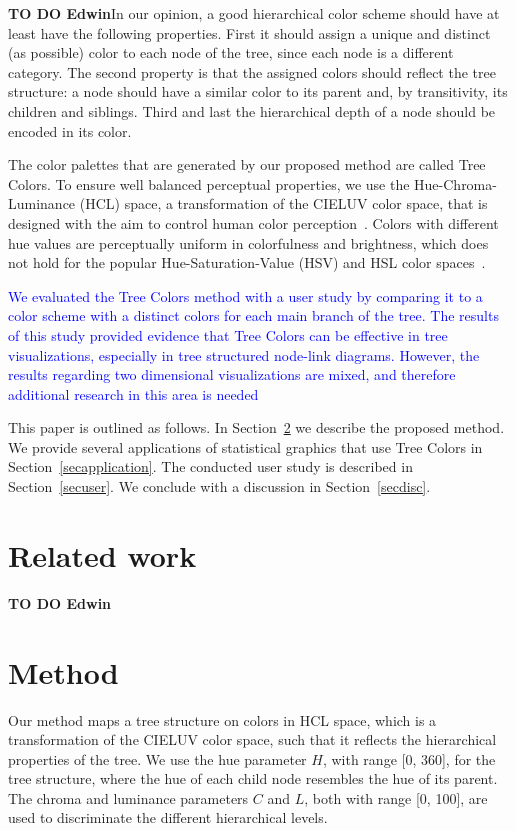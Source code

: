 \documentclass[review,journal]{vgtc}         %
\newcommand{\E}{\textcolor{cornellred}{\textbf{TO DO Edwin}}}
\newcommand{\changedM}[1]{\textcolor{blue}{#1}}
\begin{document}
\E In our opinion, a good hierarchical color scheme should have at least have the following properties. First it should assign a unique and distinct (as possible) color to each node of the tree, since each node is a different category. The second property is that the assigned colors should reflect the tree structure: a node should have a similar color to its parent and, by transitivity, its children and siblings.
Third and last the hierarchical depth of a node should be encoded in its color. 

The color palettes that are generated by our proposed method are called Tree Colors. To ensure well
balanced perceptual properties, we use the Hue-Chroma-Luminance (HCL) space, a transformation of the CIELUV color space, that is designed with the aim to control human color perception~\cite{ihaka2003}. Colors with different hue values are perceptually uniform in colorfulness and brightness, which does not hold for the popular Hue-Saturation-Value (HSV) and HSL color spaces~\cite{zeileis2009}.

\changedM{We evaluated the Tree Colors method with a user study by comparing it to a color scheme with a distinct colors for each main branch of the tree. The results of this study provided evidence that Tree Colors can be effective in tree visualizations, especially in tree structured node-link diagrams. However, the results regarding two dimensional visualizations are mixed, and therefore additional research in this area is needed}

This paper is outlined as follows. In Section~\ref{secmethod} we describe the proposed method. We provide several applications of statistical graphics that use Tree Colors in Section~\ref{secapplication}. The conducted user study is described in Section~\ref{secuser}. We conclude with a discussion in Section~\ref{secdisc}.

\section{Related work}
\E %

\section{Method}\label{secmethod}
Our method maps a tree structure on colors in HCL space, which is a transformation of the CIELUV color space, such that it reflects the hierarchical properties of the tree. We use the hue parameter $H$, with range [0, 360], for the tree structure, where the hue of each child node resembles the hue of its parent. The chroma and luminance parameters $C$ and $L$, both with range [0, 100], are used to discriminate the different hierarchical levels.
\end{document}
